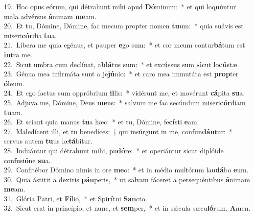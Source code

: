 {19.~}Hoc opus eórum, qui détrahunt mihi apud \textbf{Dó}minum:~* et qui loquúntur mala advérsus \textbf{á}nimam \textbf{me}am.\\
{20.~}Et tu, Dómine, Dómine, fac mecum propter nomen \textbf{tu}um:~* quia suávis est miseri\textbf{cór}dia \textbf{tu}a.\\
{21.~}Líbera me quia egénus, et pauper \textbf{e}go sum:~* et cor meum contur\textbf{bá}tum est \textbf{in}tra me.\\
{22.~}Sicut umbra cum declínat, a\textbf{blá}tus sum:~* et excússus sum \textbf{si}cut lo\textbf{cú}stæ.\\
{23.~}Génua mea infirmáta sunt a je\textbf{jú}nio:~* et caro mea immutáta est \textbf{prop}ter \textbf{ó}leum.\\
{24.~}Et ego factus sum oppróbrium \textbf{il}lis:~* vidérunt me, et movérunt \textbf{cá}pita \textbf{su}a.\\
{25.~}Adjuva me, Dómine, Deus \textbf{me}us:~* salvum me fac secúndum miseri\textbf{cór}diam \textbf{tu}am.\\
{26.~}Et sciant quia manus \textbf{tu}a hæc:~* et tu, Dómine, fe\textbf{cí}sti \textbf{e}am.\\
{27.~}Maledícent illi, et tu benedíces:~† qui insúrgunt in me, confun\textbf{dán}tur:~* servus autem \textbf{tu}us læ\textbf{tá}bitur.\\
{28.~}Induántur qui détrahunt mihi, pu\textbf{dó}re:~* et operiántur sicut diplóide confusi\textbf{ó}ne \textbf{su}a.\\
{29.~}Confitébor Dómino nimis in ore \textbf{me}o:~* et in médio multórum lau\textbf{dá}bo \textbf{e}um.\\
{30.~}Quia ástitit a dextris \textbf{páu}peris,~* ut salvam fáceret a persequéntibus \textbf{á}nimam \textbf{me}am.\\
{31.~}Glória Patri, et \textbf{Fí}lio,~* et Spi\textbf{rí}tui \textbf{San}cto.\\
{32.~}Sicut erat in princípio, et nunc, et \textbf{sem}per,~* et in sǽcula sæcu\textbf{ló}rum. \textbf{A}men.\\
